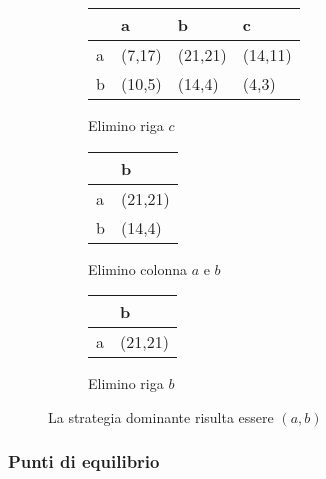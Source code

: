 \documentclass[\main/main.tex]{subfiles}
\begin{document}
\begin{figure}
  \begin{subfigure}{0.31\textwidth}
    \begin{table}
      \begin{tabular}{|L|L|L|L|}
        \hline
          & a      & b       & c       \\
        \hline
        a & (7,17) & (21,21) & (14,11) \\
        \hline
        b & (10,5) & (14,4)  & (4,3)   \\
        \hline
      \end{tabular}
    \end{table}
    \caption{Elimino riga $c$}
    \label{2017_t1}
  \end{subfigure}
  \begin{subfigure}{0.31\textwidth}
    \begin{table}
      \begin{tabular}{|L|L|}
        \hline
          & b       \\
        \hline
        a & (21,21) \\
        \hline
        b & (14,4)  \\
        \hline
      \end{tabular}
    \end{table}
    \caption{Elimino colonna $a$ e $b$}
    \label{2017_t2}
  \end{subfigure}
  \begin{subfigure}{0.31\textwidth}
    \begin{table}
      \begin{tabular}{|L|L|}
        \hline
          & b       \\
        \hline
        a & (21,21) \\
        \hline
      \end{tabular}
    \end{table}
    \caption{Elimino riga $b$}
    \label{2017_t3}
  \end{subfigure}
  \caption{La strategia dominante risulta essere $(a,b)$}
\end{figure}

\subsubsection*{Punti di equilibrio}
\end{document}
